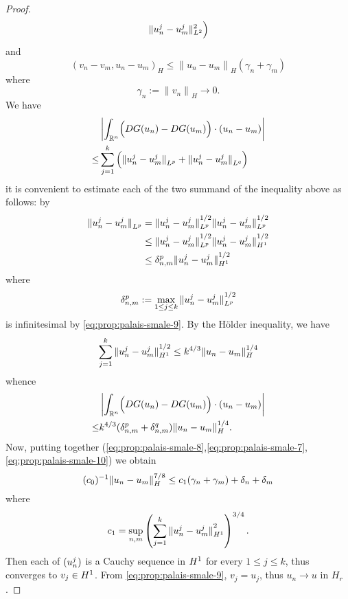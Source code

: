 \documentclass[a4paper,12pt,oneside]{amsart}
\theoremstyle{definition}
\theoremstyle{remark}
\theoremstyle{theorem}
\begin{document}
\begin{proof}
\begin{equation}
\begin{split}
\|u_n \sp j - u_m\sp j\|_{L^2} ^2\Big)
\end{split}
\end{equation}
and 
\begin{equation}
\label{eq:prop:palais-smale-7}
(v_n - v_m,u_n - u_m)_H \leq {\|{u_n - u_m}\|}_H (\gamma_n + \gamma_m)
\end{equation}
where
\begin{equation}
\label{eq:prop:palais-smale-12}
\gamma_n := {\|{v_n}\|}_H{\rightarrow} 0.
\end{equation}
We have
\[
\begin{split}
&\left|{\int_{{\mathbb{R}}\sp{n}}} \Big({D}{G}(u_n) - {D}{G}(u_m)\Big)\cdot (u_n - u_m)\right|\\
\leq&
\sum_{j = 1}\sp k \Big({\|{u_n \sp j - u_m\sp j}\|}_{L\sp p} 
+ {\|{u_n \sp j - u_m\sp j}\|}_{L\sp q}\Big)
\end{split}
\]
it is convenient to estimate each of the two summand of the inequality above 
as follows: by 
\cite[Corollaire~IX.10,p.\,165]{Bre83}
\begin{equation}
\label{eq:prop:palais-smale-6}
\begin{split}
{\|{u_n \sp j - u_m\sp j}\|}_{L\sp p} &= 
{\|{u_n \sp j - u_m\sp j}\|}_{L\sp p}\sp{1/2}
{\|{u_n \sp j - u_m\sp j}\|}_{L\sp p}\sp{1/2}\\
&\leq
{\|{u_n \sp j - u_m\sp j}\|}_{L\sp p}\sp{1/2}
{\|{u_n \sp j - u_m\sp j}\|}_{H\sp 1}\sp{1/2}\\
&\leq \delta_{n,m} \sp p {\|{u_n \sp j - u_m\sp j}\|}_{H\sp 1}\sp{1/2}
\end{split}
\end{equation}
where
\[
\delta_{n,m}\sp p := \max_{1\leq j\leq k}
{\|{u_n \sp j - u_m\sp j}\|}_{L\sp p}\sp{1/2}
\]
is infinitesimal by \eqref{eq:prop:palais-smale-9}.
By the H\"older inequality, we have
\[
\sum_{j = 1}\sp k {\|{u_n\sp j - u_m\sp j}\|}_{H\sp 1}\sp{1/2}
\leq k\sp{4/3}{\|{u_n - u_m}\|}_H \sp{1/4}
\]
whence
\begin{equation}
\label{eq:prop:palais-smale-10}
\begin{split}
&\left|{\int_{{\mathbb{R}}\sp{n}}} \Big({D}{G}(u_n) - {D}{G}(u_m)\Big)\cdot (u_n - u_m)\right|\\
\leq&
k\sp{4/3} (\delta_{n,m} \sp p + \delta_{n,m} \sp q) 
{\|{u_n - u_m}\|}_H \sp{1/4}.
\end{split}
\end{equation}
Now, putting together 
(\ref{eq:prop:palais-smale-8},\ref{eq:prop:palais-smale-7},
\ref{eq:prop:palais-smale-10}) we obtain
\[
(c_0)\sp{-1}
{\|{u_n - u_m}\|}_H \sp{7/8}
\leq c_1 (\gamma_n + \gamma_m) + \delta_n + \delta_m
\]
where
\[
c_1 = \sup_{n,m} \left(\sum_{j = 1}\sp k 
{\|{u_n \sp j - u_m\sp j}\|}_{H\sp 1}\sp 2\right)\sp{3/4}.
\]
Then each of $ (u_n \sp j) $ is a Cauchy sequence in $ H\sp 1 $ for
every $ 1\leq j\leq k $, thus converges to $ v_j\in H\sp 1 $. 
From \eqref{eq:prop:palais-smale-9}, $ v_j = u_j $, thus $ u_n{\rightarrow} u $
in $ H_r $.
\end{proof}
\end{document}
